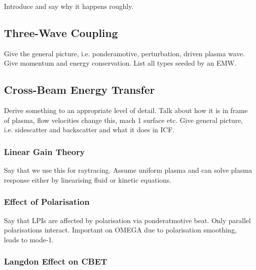 Introduce and say why it happens roughly.

\subsection{Three-Wave Coupling}%
\label{sec:theory_threewave}

Give the general picture, i.e. ponderamotive, perturbation, driven plasma wave.
Give momentum and energy conservation.
List all types seeded by an EMW.

\subsection{Cross-Beam Energy Transfer}%
\label{sec:theory_CBET}

Derive something to an appropriate level of detail.
Talk about how it is in frame of plasma, flow velocities change this, mach 1 surface etc.
Give general picture, i.e. sidescatter and backscatter and what it does in ICF.


\subsubsection{Linear Gain Theory}%
\label{sec:theory_lineargaincbet}

Say that we use this for raytracing.
Assume uniform plasma and can solve plasma response either by linearising fluid or kinetic equations.

\subsubsection{Effect of Polarisation}%
\label{sec:theory_cbet_polarisation}

Say that LPIs are affected by polarisation via ponderatmotive beat.
Only parallel polarisations interact.
Important on OMEGA due to polarisation smoothing, leads to mode-1.

\subsubsection{Langdon Effect on CBET}%
\label{sec:theory_cbet_langdon}

